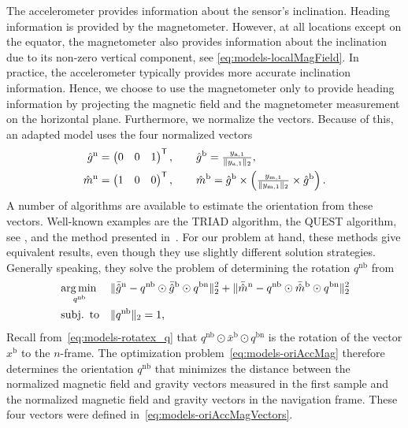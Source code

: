 The accelerometer provides information about the sensor's inclination. Heading information is provided by the magnetometer. However, at all locations except on the equator, the magnetometer also provides information about the inclination due to its non-zero vertical component, see \eqref{eq:models-localMagField}. In practice, the accelerometer typically provides more accurate inclination information. Hence, we choose to use the magnetometer only to provide heading information by projecting the magnetic field and the magnetometer measurement on the horizontal plane. Furthermore, we normalize the vectors. Because of this, an adapted model uses the four normalized vectors
\begin{subequations}
\label{eq:models-oriAccMagVectors}
\begin{align}
\hat{g}^\text{n} &= \begin{pmatrix} 0 & 0 & 1 \end{pmatrix}^{\mathsf{T}},  \qquad
\hat{g}^\text{b} = \tfrac{y_{\text{a},1}}{\| y_{\text{a},1} \|_2}, \\
\hat{m}^\text{n} &= \begin{pmatrix} 1 & 0 & 0 \end{pmatrix}^{\mathsf{T}}, \qquad 
\hat{m}^\text{b} = \hat{g}^\text{b} \times \left( \tfrac{y_{\text{m},1}}{\| y_{\text{m},1} \|_2}  \times \hat{g}^\text{b}\right).
\end{align}
\end{subequations}
A number of algorithms are available to estimate the orientation from these vectors. Well-known examples are the TRIAD algorithm, the QUEST algorithm, see \eg \cite{shusterO:1981}, and the method presented in~\cite{horn:1987}. For our problem at hand, these methods give equivalent results, even though they use slightly different solution strategies. Generally speaking, they solve the problem of determining the rotation $q^\text{nb}$ from 
\begin{align}
\label{eq:models-oriAccMag}
&\operatorname*{arg \, min \,}_{q^\text{nb}} &&\| \bar{\hat{g}}^\text{n} - q^\text{nb} \odot \bar{\hat{g}}^\text{b} \odot q^\text{bn} \|^2_2 +  
\| \bar{\hat{m}}^\text{n} - q^\text{nb} \odot \bar{\hat{m}}^\text{b} \odot q^\text{bn} \|^2_2 \nonumber \\
& \operatorname*{subj. \ to} &&\| q^\text{nb} \|_2 = 1,
\end{align}
Recall from~\eqref{eq:models-rotatex_q} that $q^\text{nb} \odot \bar{x}^\text{b} \odot q^\text{bn}$ is the rotation of the vector $x^\text{b}$ to the $n$-frame. The optimization problem~\eqref{eq:models-oriAccMag} therefore determines the orientation $q^\text{nb}$ that minimizes the distance between the normalized magnetic field and gravity vectors measured in the first sample and the normalized magnetic field and gravity vectors in the navigation frame. These four vectors were defined in~\eqref{eq:models-oriAccMagVectors}.


